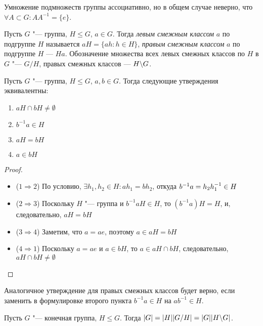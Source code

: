 \begin{note}
	Умножение подмножеств группы ассоциативно, но в общем случае неверно, что $\forall A \subset G: AA^{-1} = \{e\}$.
\end{note}

\begin{definition}
	Пусть $G$ "--- группа, $H \le G$, $a \in G$. Тогда \textit{левым смежным классом} $a$ по подгруппе $H$ называется $aH = \{ah: h \in H\}$, \textit{правым смежным классом} $a$ по подгруппе $H$ --- $Ha$. Обозначение множества всех левых смежных классов по $H$ в $G$ "--- $G/H$, правых смежных классов --- $H\backslash G$.
\end{definition}

\begin{proposition}
	Пусть $G$ "--- группа, $H \le G$, $a, b \in G$. Тогда следующие утверждения эквивалентны:
	\begin{enumerate}
		\item $aH \cap bH \ne \emptyset$
		\item $b^{-1}a \in H$
		\item $aH = bH$
		\item $a \in bH$
	\end{enumerate}
\end{proposition}

\begin{proof}~
	\begin{itemize}
		\item ($1 \Rightarrow 2$) По условию, $\exists h_1, h_2 \in H: ah_1 = bh_2$, откуда $b^{-1}a \hm= h_2h_1^{-1} \in H$
		\item ($2 \Rightarrow 3$) Поскольку $H$ "--- группа и $b^{-1}aH \in H$, то $(b^{-1}a)H = H$, и, следовательно, $aH = bH$
		\item ($3 \Rightarrow 4$) Заметим, что $a = ae$, поэтому $a \in aH = bH$
		\item ($4 \Rightarrow 1$) Поскольку $a = ae$ и $a \in bH$, то $a \in aH \cap bH$, следовательно, $aH \cap bH \ne \emptyset$
	\end{itemize}
\end{proof}

\begin{note}
	Аналогичное утверждение для правых смежных классов будет верно, если заменить в формулировке второго пункта $b^{-1}a \in H$ на $ab^{-1} \in H$.
\end{note}

\begin{theorem}[Лагранжа]
	Пусть $G$ "--- конечная группа, $H \le G$. Тогда $|G| = |H||G / H| \hm= |G||H \bs G|$.
\end{theorem}

